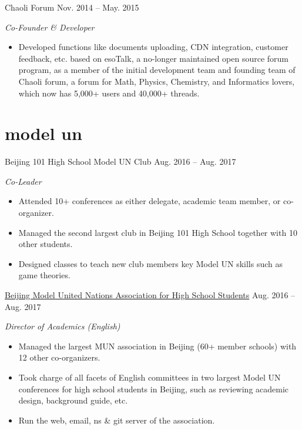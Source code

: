 \documentclass[hidelinks__VERSION__]{adamyi-cv}
\begin{document}
\begin{entrylist}

\entry
{Chaoli Forum}
{Nov. 2014 -- May. 2015}
{\emph{Co-Founder \& Developer}
\begin{itemize}
\item Developed functions like documents uploading, CDN integration, customer feedback, etc. based on esoTalk, a no-longer maintained open source forum program, as a member of the initial development team and founding team of Chaoli forum, a forum for Math, Physics, Chemistry, and Informatics lovers, which now has 5,000+ users and 40,000+ threads.
\end{itemize}}


\end{entrylist}


\section{model un}

\begin{entrylist}


\entry
{Beijing 101 High School Model UN Club}
{Aug. 2016 -- Aug. 2017}
{\emph{Co-Leader}
\begin{itemize}
\item Attended 10+ conferences as either delegate, academic team member, or co-organizer.
\item Managed the second largest club in Beijing 101 High School together with 10 other students.
\item Designed classes to teach new club members key Model UN skills such as game theories.
\end{itemize}}


\entry
{\href{https://bjmun.org}{Beijing Model United Nations Association for High School Students}}
{Aug. 2016 -- Aug. 2017}
{\emph{Director of Academics (English)}
\begin{itemize}
\item Managed the largest MUN association in Beijing (60+ member schools) with 12 other co-organizers.
\item Took charge of all facets of English committees in two largest Model UN conferences for high school students in Beijing, such as reviewing academic design, background guide, etc.
\item Run the web, email, ns \& git server of the association.
\end{itemize}}


\end{entrylist}
\end{document}
